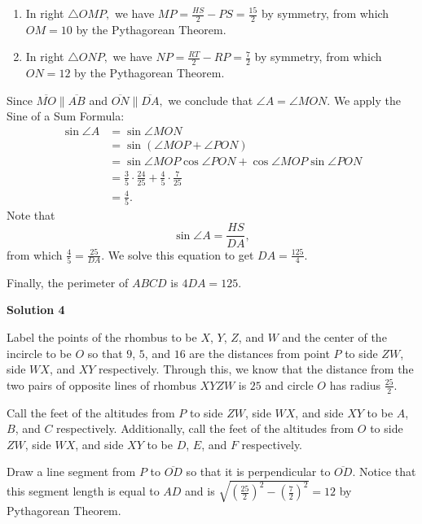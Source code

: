 \begin{enumerate}
{{ 
            \begin{enumerate} 
        \item In right $\triangle OMP,$ we have $MP=\frac{HS}{2}-PS=\frac{15}{2}$ by symmetry, from which $OM=10$ by the Pythagorean Theorem.

        \item In right $\triangle ONP,$ we have $NP=\frac{RT}{2}-RP=\frac{7}{2}$ by symmetry, from which $ON=12$ by the Pythagorean Theorem.

            \end{enumerate}
            Since $\overline{MO}\parallel\overline{AB}$ and $\overline{ON}\parallel\overline{DA},$ we conclude that $\angle A = \angle MON.$ We apply the Sine of a Sum Formula:
 \begin{align*} \sin\angle A &= \sin\angle MON \\ &= \sin(\angle MOP + \angle PON) \\ &= \sin\angle MOP \cos\angle PON + \cos\angle MOP \sin\angle PON \\ &= \frac{3}{5}\cdot\frac{24}{25} + \frac{4}{5}\cdot\frac{7}{25} \\ &= \frac{4}{5}. \end{align*}
Note that 
 \[\sin\angle A = \frac{HS}{DA},\] from which $\frac{4}{5} = \frac{25}{DA}.$ We solve this equation to get $DA=\frac{125}{4}.$

 Finally, the perimeter of $ABCD$ is $4DA = \boxed{125}.$




\textbf{Solution 4}

Label the points of the rhombus to be $X$, $Y$, $Z$, and $W$ and the center of the incircle to be $O$ so that $9$, $5$, and $16$ are the distances from point $P$ to side $ZW$, side $WX$, and $XY$ respectively. Through this, we know that the distance from the two pairs of opposite lines of rhombus $XYZW$ is $25$ and circle $O$ has radius $\frac{25}{2}$. 

 Call the feet of the altitudes from $P$ to side $ZW$, side $WX$, and side $XY$ to be $A$, $B$, and $C$ respectively. Additionally, call the feet of the altitudes from $O$ to side $ZW$, side $WX$, and side $XY$ to be $D$, $E$, and $F$ respectively.

 Draw a line segment from $P$ to $\overline{OD}$ so that it is perpendicular to $\overline{OD}$. Notice that this segment length is equal to $AD$ and is $\sqrt{\left(\frac{25}{2}\right)^2-\left(\frac{7}{2}\right)^2}=12$ by Pythagorean Theorem.

}}
\end{enumerate}
